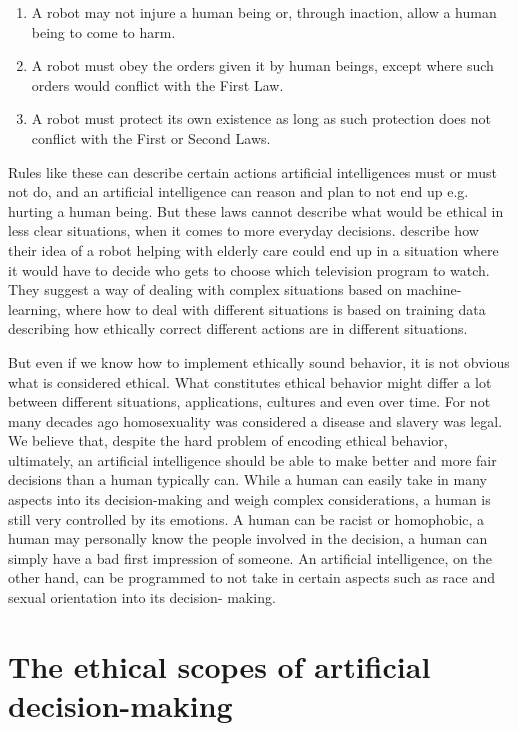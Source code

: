 \documentclass[11pt]{article}
\begin{document}
\begin{enumerate}
  \item A robot may not injure a human being or, through inaction, allow a human being to come to harm.
  \item A robot must obey the orders given it by human beings, except where such orders would conflict 
  with the First Law.
  \item A robot must protect its own existence as long as such protection does not conflict with the 
  First or Second Laws.
\end{enumerate}

Rules like these can describe certain actions artificial intelligences must or must not do, and an
artificial intelligence can reason and plan to not end up e.g. hurting a human being. But these laws 
cannot describe what would be ethical in less clear situations, when it comes to more everyday decisions.
\citeauthor{anderson2010robot} describe how their idea of a robot helping with elderly care could end up
in a situation where it would have to decide who gets to choose which television program to watch. They suggest a way of dealing with complex situations based on machine-learning, where how to deal with different 
situations is based on training data describing how ethically correct different actions are in different
situations.

But even if we know how to implement ethically sound behavior, it is not obvious what is considered ethical.
What constitutes ethical behavior might differ a
lot between different situations, applications, cultures and even over time. 
For not many decades ago homosexuality was considered a disease and slavery was legal.
We believe that, despite the hard problem of encoding ethical behavior,
ultimately, an artificial intelligence should be able to make better and more fair decisions than a
human typically can. While a human can easily take in many aspects into
its decision-making and weigh complex considerations, a human is still very
controlled by its emotions. A human can be racist or homophobic, a human may
personally know the people involved in the decision, a human can simply have a
bad first impression of someone. An artificial intelligence, on the other hand, can be programmed to not
take in certain aspects such as race and sexual orientation into its decision-
making. 

\section{The ethical scopes of artificial decision-making}
\end{document}
